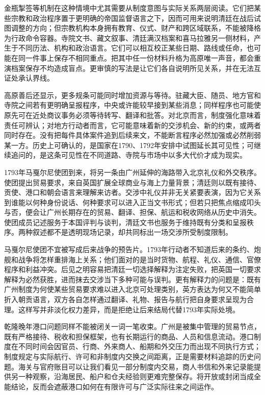 金瓶掣签等机制在这种情境中尤其需要从制度意图与实际关系两层阅读。它们把某些宗教和政治程序置于更明确的帝国监督语言之下，因而可用来说明清廷在战后试图调整的方向；但宗教机构本身拥有教育、仪式、财产和跨区域联系，不能被降格为行政命令容器。寺院文书、藏文叙事、清廷满汉档案和喜马拉雅另一侧材料，产生于不同历法、机构和政治语言。它们可以相互校正某些日期、路线或任命，也可能在同一件事上保存不相同重点。把其中任一份材料升格为高原唯一声音，都会重演档案保存不均造成盲点。更审慎的写法是让它们各自说明所见关系，并在无法互证处承认界线。

高原善后还显示，更多规条可能同时增加资源与等待。驻藏大臣、随员、地方官和寺院之间若有更明确呈报程序，中央或许能较早接到某些消息；同样程序也可能使原先可在近处商议事务必须等待转写、翻译和批答。对北京而言，制度强化意味着责任可辨认；对地方行动者而言，它可能意味着新的交涉机会、新的约束，或两者同时存在。没有把每件具体案件追到后续来文，不能断言程序必然加强或必然削弱某一方。历史上可确认的，是国家在1790、1792年安排中试图延长其可见性；可继续追问的，是这条可见性在不同道路、寺院与市场中以多大代价才成为现实。

1793年马戛尔尼使团到来，将另一条由广州延伸的海路带入北京礼仪和外交秩序。使团提出贸易要求，来自英国扩展全球商业与海上力量背景；清廷则以既有接待、贡使、港口和朝会语言来理解来访者。交涉中礼仪并非无关紧要表演，因为它关系到谁能以何种身份说话、何种要求可以进入正当文书形式；但若只把焦点缩成叩头与否，便会让广州长期存在的贸易、翻译、担保、航运和税收网络从历史中消失。使团成员记述服务于本国评判与谈判，清廷文书也服务于维持既有分类和呈报秩序。两种叙述都不是透明现场记录，却共同标出一场交涉所受制度限制。

马戛尔尼使团不宜被写成后来战争的预告片。1793年行动者不知道后来的条约、炮舰和战争将怎样重排海上关系；他们面对的是当时货物、航程、礼仪、通信、官僚程序和利益冲突。后见之明容易把清廷一切选择解释为注定失败，把英国一切要求解释为必然获胜，进而抹去交涉当下多种可能与误判。更有解释力的问题是：既有广州制度为何使某些贸易要求难以进入北京可处理类别，英方表达为何又不能简单折入朝贡语言，双方各自怎样通过翻译、礼物、报告与航行把自身要求呈现为合理。这样写并非淡化权力差异，而是拒绝让后来结局代替1793年实际处境。

乾隆晚年港口问题同样不能被闭关一词一笔收束。广州是被集中管理的贸易节点，既有严格接待、税收和担保框架，也有长期运行的商品、人员和信息流动。港口制度在不同时间会因官员、行商、外来商人、船期和外交压力而出现不同执行方式；制度规定与实际航行、许可和非制度内交换之间距离，正是需要材料追踪的历史问题。海关与官府账目可以让我们看见一部分制度内交易，商人书信和外来记录能提供另一种观察，沿海居民、船户和仓夫经验则更难完整保存。将开放或封闭当成全能结论，反而会遮蔽港口如何在有限许可与广泛实际往来之间运作。

